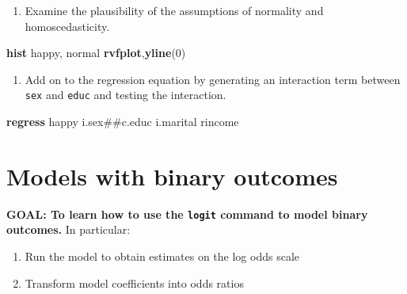 \documentclass[
]{book}
\newenvironment{Shaded}{\begin{snugshade}}{\end{snugshade}}
\newcommand{\FunctionTok}[1]{\textcolor[rgb]{0.00,0.00,0.00}{#1}}
\newcommand{\KeywordTok}[1]{\textcolor[rgb]{0.13,0.29,0.53}{\textbf{#1}}}
\newcommand{\NormalTok}[1]{#1}
\providecommand{\tightlist}{%
  \setlength{\itemsep}{0pt}\setlength{\parskip}{0pt}}
\begin{document}
\begin{alert}
\begin{enumerate}
\def\labelenumi{\arabic{enumi}.}
\setcounter{enumi}{2}
\tightlist
\item
  Examine the plausibility of the assumptions of normality and homoscedasticity.
\end{enumerate}

\begin{Shaded}
\begin{Highlighting}[]
\KeywordTok{hist}\NormalTok{ happy, }\FunctionTok{normal} 
\KeywordTok{rvfplot}\NormalTok{,}\KeywordTok{yline}\NormalTok{(0)}
\end{Highlighting}
\end{Shaded}

\begin{enumerate}
\def\labelenumi{\arabic{enumi}.}
\setcounter{enumi}{3}
\tightlist
\item
  Add on to the regression equation by generating an interaction term between \texttt{sex} and \texttt{educ} and testing the interaction.
\end{enumerate}

\begin{Shaded}
\begin{Highlighting}[]
\KeywordTok{regress}\NormalTok{ happy i.sex\#\#c.educ i.marital rincome}
\end{Highlighting}
\end{Shaded}

\end{alert}

\hypertarget{models-with-binary-outcomes-1}{%
\section{Models with binary outcomes}\label{models-with-binary-outcomes-1}}

\begin{alert}

\textbf{GOAL: To learn how to use the \texttt{logit} command to model binary outcomes.} In particular:

\begin{enumerate}
\def\labelenumi{\arabic{enumi}.}
\tightlist
\item
  Run the model to obtain estimates on the log odds scale
\item
  Transform model coefficients into odds ratios
\end{enumerate}

\end{alert}
\end{document}
